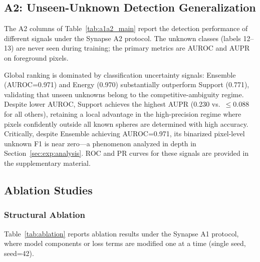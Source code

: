 \documentclass[journal]{IEEEtai}
\begin{document}
\subsection{A2: Unseen-Unknown Detection Generalization}\label{sec:exp:a2}

The A2 columns of Table~\ref{tab:a1a2_main} report the detection performance of
different signals under the Synapse A2 protocol.
The unknown classes (labels 12--13) are never seen during training;
the primary metrics are AUROC and AUPR on foreground pixels.

Global ranking is dominated by classification uncertainty signals: Ensemble
(AUROC=0.971) and Energy (0.970) substantially outperform Support (0.771),
validating that unseen unknowns belong to the competitive-ambiguity regime.
Despite lower AUROC, Support achieves the highest AUPR (0.230 vs.\ $\leq$0.088 for
all others), retaining a local advantage in the high-precision regime where pixels
confidently outside all known spheres are determined with high accuracy.
Critically, despite Ensemble achieving AUROC=0.971, its binarized pixel-level unknown
F1 is near zero---a phenomenon analyzed in depth in Section~\ref{sec:exp:analysis}.
ROC and PR curves for these signals are provided in the supplementary material.


\subsection{Ablation Studies}\label{sec:exp:ablation}

\subsubsection{Structural Ablation}\label{sec:exp:ablation:struct}

Table~\ref{tab:ablation} reports ablation results under the Synapse A1 protocol,
where model components or loss terms are modified one at a time (single seed, seed=42).
\end{document}
